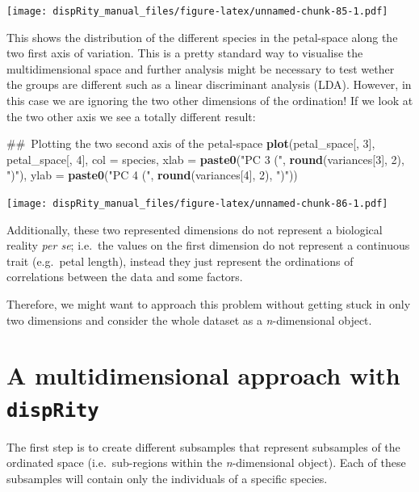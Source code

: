 \documentclass[]{book}
\newenvironment{Shaded}{\begin{snugshade}}{\end{snugshade}}
\newcommand{\KeywordTok}[1]{\textcolor[rgb]{0.13,0.29,0.53}{\textbf{#1}}}
\newcommand{\DataTypeTok}[1]{\textcolor[rgb]{0.13,0.29,0.53}{#1}}
\newcommand{\DecValTok}[1]{\textcolor[rgb]{0.00,0.00,0.81}{#1}}
\newcommand{\StringTok}[1]{\textcolor[rgb]{0.31,0.60,0.02}{#1}}
\newcommand{\NormalTok}[1]{#1}
\theoremstyle{definition}
\theoremstyle{definition}
\theoremstyle{remark}
\begin{document}
\texttt{[image: dispRity\_manual\_files/figure-latex/unnamed-chunk-85-1.pdf]}

This shows the distribution of the different species in the petal-space
along the two first axis of variation. This is a pretty standard way to
visualise the multidimensional space and further analysis might be
necessary to test wether the groups are different such as a linear
discriminant analysis (LDA). However, in this case we are ignoring the
two other dimensions of the ordination! If we look at the two other axis
we see a totally different result:

\begin{Shaded}
\begin{Highlighting}[]
\NormalTok{## Plotting the two second axis of the petal-space}
\KeywordTok{plot}\NormalTok{(petal_space[, }\DecValTok{3}\NormalTok{], petal_space[, }\DecValTok{4}\NormalTok{], }\DataTypeTok{col =}\NormalTok{ species,}
    \DataTypeTok{xlab =} \KeywordTok{paste0}\NormalTok{(}\StringTok{"PC 3 ("}\NormalTok{, }\KeywordTok{round}\NormalTok{(variances[}\DecValTok{3}\NormalTok{], }\DecValTok{2}\NormalTok{), }\StringTok{")"}\NormalTok{),}
    \DataTypeTok{ylab =} \KeywordTok{paste0}\NormalTok{(}\StringTok{"PC 4 ("}\NormalTok{, }\KeywordTok{round}\NormalTok{(variances[}\DecValTok{4}\NormalTok{], }\DecValTok{2}\NormalTok{), }\StringTok{")"}\NormalTok{))}
\end{Highlighting}
\end{Shaded}

\texttt{[image: dispRity\_manual\_files/figure-latex/unnamed-chunk-86-1.pdf]}

Additionally, these two represented dimensions do not represent a
biological reality \emph{per se}; i.e.~the values on the first dimension
do not represent a continuous trait (e.g.~petal length), instead they
just represent the ordinations of correlations between the data and some
factors.

Therefore, we might want to approach this problem without getting stuck
in only two dimensions and consider the whole dataset as a
\emph{n}-dimensional object.

\section{\texorpdfstring{A multidimensional approach with
\texttt{dispRity}}{A multidimensional approach with dispRity}}\label{a-multidimensional-approach-with-disprity}

The first step is to create different subsamples that represent
subsamples of the ordinated space (i.e.~sub-regions within the
\emph{n}-dimensional object). Each of these subsamples will contain only
the individuals of a specific species.
\end{document}
